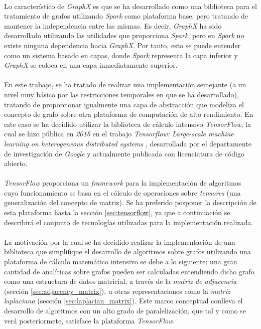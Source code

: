 \documentclass{subfiles}
\begin{document}
      \paragraph{}
      Lo característico de \emph{GraphX} es que se ha desarrollado como una biblioteca para el tratamiento de grafos utilizando \emph{Spark} como plataforma base, pero tratando de mantener la independencia entre las mismas. Es decir, \emph{GraphX} ha sido desarrollado utilizando las utilidades que proporciona \emph{Spark}, pero en \emph{Spark} no existe ninguna dependencia hacia \emph{GraphX}. Por tanto, esto se puede entender como un sistema basado en capas, donde \emph{Spark} representa la capa inferior y \emph{GraphX} se coloca en una capa inmediatamente superior.

      \paragraph{}
      En este trabajo, se ha tratado de realizar una implementación semejante (a un nivel muy básico por las restricciones temporales en que se ha desarrollado), tratando de proporcionar igualmente una capa de abstracción que modeliza el concepto de grafo sobre otra plataforma de computación de alto rendimiento. En este caso se ha decidido utilizar la biblioteca de cálculo intensivo \emph{TensorFlow}, la cual se hizo pública en \emph{2016} en el trabajo \emph{Tensorflow: Large-scale machine learning on heterogeneous distributed systems} \cite{abadi2016tensorflow}, desarrollada por el departamente de investigación de \emph{Google} y actualmente publicada con licenciatura de código abierto.

      \paragraph{}
      \emph{TensorFlow} proporciona un \emph{framework} para la implementación de algoritmos cuyo funcionamiento se basa en el cálculo de operaciones sobre \emph{tensores} (una generalización del concepto de matriz). Se ha preferido posponer la descripción de esta plataforma hasta la sección \ref{sec:tensorflow}, ya que a continuación se describirá el conjunto de tecnologías utilizadas para la implementación realizada.

      \paragraph{}
      La motivación por la cual se ha decidido realizar la implementación de una biblioteca que simplifique el desarrollo de algoritmos sobre grafos utilizando una plataforma de cálculo matemático intensivo se debe a lo siguiente: una gran cantidad de analíticas sobre grafos pueden ser calculadas entendiendo dicho grafo como una estructura de datos matricial, a través de la \emph{matriz de adjacencia} (sección \ref{sec:adjacency_matrix}), u otras representaciones como la \emph{matriz laplaciana} (sección \ref{sec:laplacian_matrix}). Este marco conceptual conlleva el desarrollo de algoritmos con un alto grado de paralelización, que tal y como se verá posteriormete, satisface la plataforma \emph{TensorFlow}.
\end{document}
